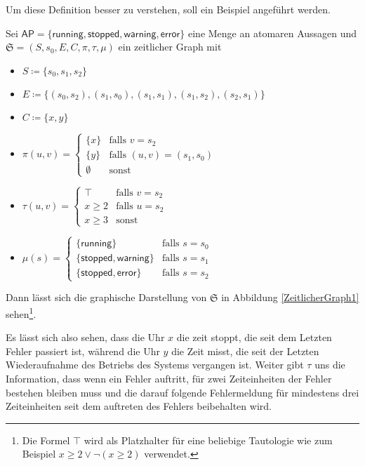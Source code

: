 Um diese Definition besser zu verstehen, soll ein Beispiel angeführt werden.
\begin{example}
	Sei $\mathsf{AP}=\{\mathsf{running},\mathsf{stopped},\mathsf{warning},\mathsf{error}\}$ eine Menge an atomaren Aussagen und $\mathfrak{S}=(S,s_0,E,C,\pi,\tau,\mu)$ ein zeitlicher Graph mit
	\begin{itemize}
		\item $S\coloneqq \{s_0,s_1,s_2\}$
		\item $E\coloneqq\{(s_0,s_2),(s_1,s_0),(s_1,s_1),(s_1,s_2),(s_2,s_1)\}$
		\item $C\coloneqq\{x,y\}$
		\item $\pi(u,v) = \begin{cases}
			\{x\} & \text{falls } v = s_2 \\
			\{y\} & \text{falls } (u,v)=(s_1,s_0) \\
			\emptyset & \text{sonst} \end{cases}$
		\item $\tau(u,v) = \begin{cases}
			\top & \text{falls } v = s_2 \\
			x\geq 2 & \text{falls } u = s_2 \\
			x \geq 3 & \text{sonst}
		\end{cases}$
		\item $\mu(s)=\begin{cases}
			\{\mathsf{running}\} & \text{falls } s = s_0 \\
			\{\mathsf{stopped},\mathsf{warning}\} & \text{falls } s = s_1 \\
			\{\mathsf{stopped},\mathsf{error}\} & \text{falls } s = s_2
		\end{cases}$
	\end{itemize}
	Dann lässt sich die graphische Darstellung von $\mathfrak{S}$ in Abbildung \ref{ZeitlicherGraph1} sehen\footnote{Die Formel $\top$ wird als Platzhalter für eine beliebige Tautologie wie zum Beispiel $x \geq 2 \lor \neg(x\geq 2)$ verwendet.}.
	
	Es lässt sich also sehen, dass die Uhr $x$ die zeit stoppt, die seit dem Letzten Fehler passiert ist, während die Uhr $y$ die Zeit misst, die seit der Letzten Wiederaufnahme des Betriebs des Systems vergangen ist.
	Weiter gibt $\tau$ uns die Information, dass wenn ein Fehler auftritt, für zwei Zeiteinheiten der Fehler bestehen bleiben muss und die darauf folgende Fehlermeldung für mindestens drei Zeiteinheiten seit dem auftreten des Fehlers beibehalten wird.
\end{example}

